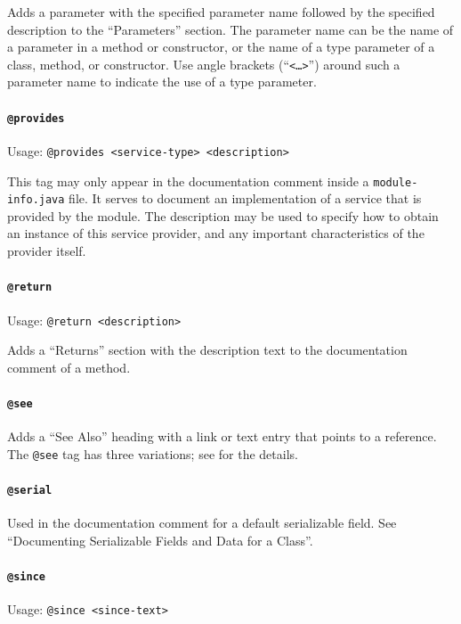 \documentclass[11pt,a4paper, titlepage, parskip=half, headsepline, footsepline, cleardoublepage=current, headheight=1cm]{scrbook}
\begin{document}
Adds a parameter with the specified parameter name followed by the specified description to the “Parameters” section. The parameter name can be the name of a parameter in a method or constructor, or the name of a type parameter of a class, method, or constructor. Use angle brackets (“\verb#<…>#”) around such a parameter name to indicate the use of a type parameter.

\paragraph{\lstinline|@provides|}\label{sec:TagProvides}  Usage: \lstinline|@provides <service-type> <description>|

This tag may only appear in the documentation comment inside a \verb#module-info.java# file. It serves to document an implementation of a service that is provided by the module. The description may be used to specify how to obtain an instance of this service provider, and any important characteristics of the provider itself. 

\paragraph{\lstinline|@return|}\label{sec:TagReturn}  Usage: \lstinline|@return <description>|

Adds a “Returns” section with the description text to the documentation comment of a method.

\paragraph{\lstinline|@see|}\label{sec:TagSee}  Adds a “See Also” heading with a link or text entry that points to a reference. The \lstinline|@see| tag has three variations; see \autocite{ORACLE_DOC_JAVADOC_TAG} for the details.

\paragraph{\lstinline|@serial|}\label{sec:TagSerial} Used in the documentation comment for a default serializable field. See “Documenting Serializable Fields and Data for a Class”\autocite{ORACLE_DOC_OBJECT_SERIALIZATION:DocumentingSerializableFieldsData}. 

\paragraph{\lstinline|@since|}\label{sec:TagSince}  Usage: \lstinline|@since <since-text>|
\end{document}
